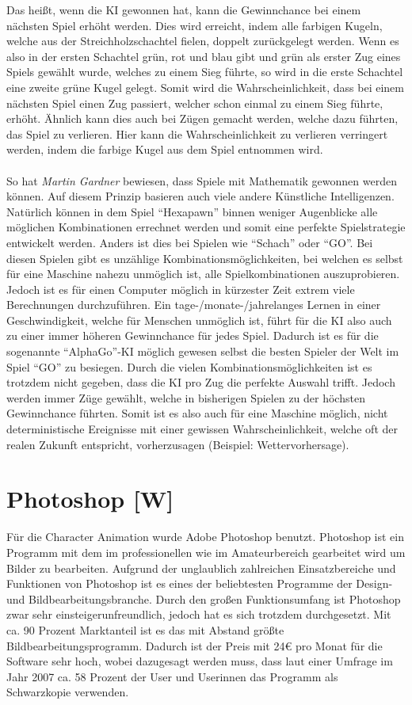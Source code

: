 Das heißt, wenn die KI gewonnen hat, kann die Gewinnchance bei einem nächsten Spiel erhöht werden. Dies wird erreicht, indem alle farbigen Kugeln, welche aus der Streichholzschachtel fielen, doppelt zurückgelegt werden. Wenn es also in der ersten Schachtel grün, rot und blau gibt und grün als erster Zug eines Spiels gewählt wurde, welches zu einem Sieg führte, so wird in die erste Schachtel eine zweite grüne Kugel gelegt. Somit wird die Wahrscheinlichkeit, dass bei einem nächsten Spiel einen Zug passiert, welcher schon einmal zu einem Sieg führte, erhöht. Ähnlich kann dies auch bei Zügen gemacht werden, welche dazu führten, das Spiel zu verlieren. Hier kann die Wahrscheinlichkeit zu verlieren verringert werden, indem die farbige Kugel aus dem Spiel entnommen wird.\\
\\
So hat \textit{Martin Gardner} bewiesen, dass Spiele mit Mathematik gewonnen werden können. Auf diesem Prinzip basieren auch viele andere Künstliche Intelligenzen. Natürlich können in dem Spiel ``Hexapawn'' binnen weniger Augenblicke alle möglichen Kombinationen errechnet werden und somit eine perfekte Spielstrategie entwickelt werden. Anders ist dies bei Spielen wie ``Schach'' oder ``GO''. Bei diesen Spielen gibt es unzählige Kombinationsmöglichkeiten, bei welchen es selbst für eine Maschine nahezu unmöglich ist, alle Spielkombinationen auszuprobieren. Jedoch ist es für einen Computer möglich in kürzester Zeit extrem viele Berechnungen durchzuführen. Ein tage-/monate-/jahrelanges Lernen in einer Geschwindigkeit, welche für Menschen unmöglich ist, führt für die KI also auch zu einer immer höheren Gewinnchance für jedes Spiel. Dadurch ist es für die sogenannte ``AlphaGo''-KI möglich gewesen selbst die besten Spieler der Welt im Spiel ``GO'' zu besiegen. Durch die vielen Kombinationsmöglichkeiten ist es trotzdem nicht gegeben, dass die KI pro Zug die perfekte Auswahl trifft. Jedoch werden immer Züge gewählt, welche in bisherigen Spielen zu der höchsten Gewinnchance führten. Somit ist es also auch für eine Maschine möglich, nicht deterministische Ereignisse mit einer gewissen Wahrscheinlichkeit, welche oft der realen Zukunft entspricht, vorherzusagen (Beispiel: Wettervorhersage).

\newpage
\section{Photoshop [W]}
Für die Character Animation wurde Adobe Photoshop benutzt. Photoshop ist ein Programm mit dem
im professionellen wie im Amateurbereich gearbeitet wird um Bilder zu bearbeiten.
Aufgrund der unglaublich zahlreichen Einsatzbereiche und Funktionen von Photoshop ist es
eines der beliebtesten Programme der Design- und Bildbearbeitungsbranche.
Durch den großen Funktionsumfang ist Photoshop zwar sehr einsteigerunfreundlich, jedoch
hat es sich trotzdem durchgesetzt. Mit ca. 90 Prozent Marktanteil ist es das mit Abstand größte
Bildbearbeitungsprogramm. Dadurch ist der Preis mit 24€ pro Monat für die Software sehr hoch, wobei dazugesagt werden muss,
dass laut einer Umfrage im Jahr 2007 ca. 58 Prozent der User und Userinnen das Programm als Schwarzkopie verwenden.

